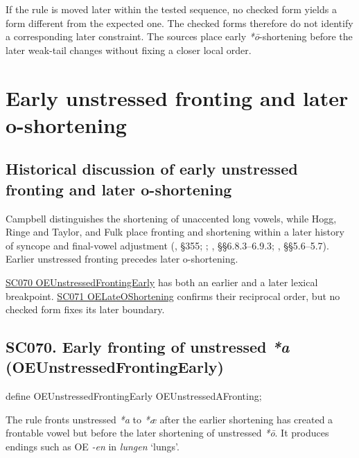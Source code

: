 \documentclass[
  british,
  a4paper,
  openany]{book}
\providecommand{\texorpdfstring}[2]{#1}
\DeclareRobustCommand{\CAPRRuleHeading}[2]{%
  #1\texorpdfstring{\\(#2)}{ (#2)}%
}
\begin{document}
If the rule is moved later within the tested sequence, no checked form
yields a form different from the expected one. The checked forms
therefore do not identify a corresponding later constraint. The sources
place early \emph{*ō}-shortening before the later weak-tail changes
without fixing a closer local order.

\newpage

\section{Early unstressed fronting and later
o-shortening}\label{early-unstressed-fronting-and-later-o-shortening}

\subsection{Historical discussion of early unstressed fronting and later
o-shortening}\label{historical-discussion-of-early-unstressed-fronting-and-later-o-shortening}

Campbell distinguishes the shortening of unaccented long vowels, while
Hogg, Ringe and Taylor, and Fulk place fronting and shortening within a
later history of syncope and final-vowel adjustment
(, §355;
;
,
§§6.8.3--6.9.3; , §§5.6--5.7).
Earlier unstressed fronting precedes later o-shortening.

\hyperref[rule-OEUnstressedFrontingEarly]{SC070
OEUnstressedFrontingEarly} has both an earlier and a later lexical
breakpoint. \hyperref[rule-OELateOShortening]{SC071 OELateOShortening}
confirms their reciprocal order, but no checked form fixes its later
boundary.

\subsection{\texorpdfstring{\CAPRRuleHeading{SC070. Early fronting of unstressed \emph{*a}}{OEUnstressedFrontingEarly}}{}}\label{rule-OEUnstressedFrontingEarly}

\begin{ReaderFacingFoma}
define OEUnstressedFrontingEarly OEUnstressedAFronting;
\end{ReaderFacingFoma}

The rule fronts unstressed \emph{*a} to \emph{*æ} after the earlier
shortening has created a frontable vowel but before the later shortening
of unstressed \emph{*ō}. It produces endings such as OE \emph{-en} in
\emph{lungen} `lungs'.
\end{document}

